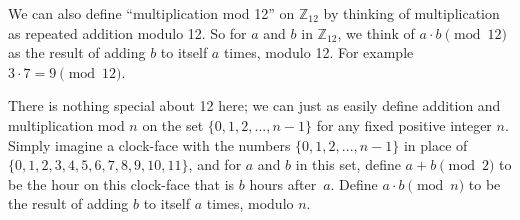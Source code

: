 We can also define ``multiplication mod 12'' on $\mathbb{Z}_{12}$ by thinking of multiplication as repeated addition modulo 12. So for $a$ and $b$ in $\mathbb{Z}_{12}$, we think of $a\cdot b \pmod{12}$ as the result of adding $b$ to itself $a$ times, modulo 12. For example $3 \cdot 7 = 9 \pmod{12}$.

There is nothing special about 12 here; we can just as easily define addition and multiplication mod $n$ on the set $\{0,1,2,...,n-1\}$ for any fixed positive integer $n$. Simply imagine a clock-face with the numbers $\{0,1,2,...,n-1\}$ in place of $\{0,1,2,3,4,5,6,7,8,9,10,11\}$, and for $a$ and $b$ in this set, define $a+b \pmod{2}$ to be the hour on this clock-face that is $b$ hours after~$a$. Define $a\cdot b \pmod{n}$ to be the result of adding $b$ to itself $a$ times, modulo $n$.

